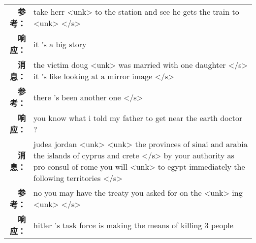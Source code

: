 \begin{tabularx}{\textwidth}{@{}rX@{}}
\textbf{参考：}& take herr <unk> to the station and see he gets the train to <unk> </s>\\%
\textbf{响应：}&it 's a big story\\%
\midrule%
\textbf{消息：}&the victim doug <unk> was married with one daughter </s> it 's like looking at a mirror image  </s>\\%
\textbf{参考：}& there 's been another one </s>\\%
\textbf{响应：}&you know what i told my father to get near the earth doctor ?\\%
\midrule%
\textbf{消息：}&judea jordan <unk> <unk> the provinces of sinai and arabia the islands of cyprus and crete </s> by your authority as pro consul of rome you will <unk> to egypt immediately the following territories  </s>\\%
\textbf{参考：}& no you may have the treaty you asked for on the <unk> ing <unk> </s>\\%
\textbf{响应：}&hitler 's task force is making the means of killing 3 people\\%
\midrule\bottomrule%
%
\end{tabularx}